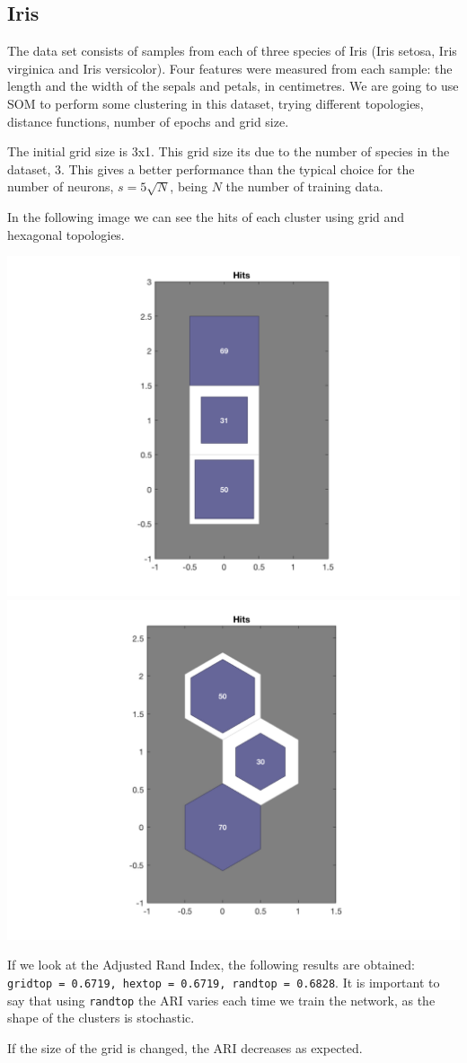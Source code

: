 \documentclass[10pt]{article}
\begin{document}
\begin{multicols}{2}
  \subsection*{Iris}
  The data set consists of samples from each of three species of Iris
  (Iris setosa, Iris virginica and Iris versicolor). Four features were
  measured from each sample: the length and the width of the sepals
  and petals, in centimetres.
  We are going to use SOM to perform some clustering in this dataset, trying different
  topologies, distance functions, number of epochs and grid size.

  The initial grid size is 3x1. This grid size its due to the number of species
  in the dataset, 3. This gives a better performance than the typical choice for
  the number of neurons, $s = 5 \sqrt{N}$, being $N$ the number of training data.

  In the following image we can see the hits of each cluster using grid and hexagonal
  topologies.

  \begin{center}
    \includegraphics[width=0.49\linewidth]{img/somirisgrid}
    \includegraphics[width=0.49\linewidth]{img/somirishex}
  \end{center}

  If we look at the Adjusted Rand Index, the following results are obtained:
  \texttt{gridtop = 0.6719, hextop = 0.6719, randtop = 0.6828}. It is important
  to say that using \texttt{randtop} the ARI varies each time we train the network,
  as the shape of the clusters is stochastic.

  If the size of the grid is changed, the ARI decreases as expected.
 
\end{multicols}
\end{document}
